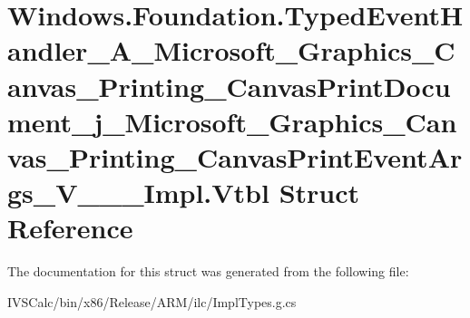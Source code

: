 \hypertarget{struct_windows_1_1_foundation_1_1_typed_event_handler___a___microsoft___graphics___canvas___prin5e98de4148f14711b8e776f3d80500e7}{}\section{Windows.\+Foundation.\+Typed\+Event\+Handler\+\_\+\+A\+\_\+\+Microsoft\+\_\+\+Graphics\+\_\+\+Canvas\+\_\+\+Printing\+\_\+\+Canvas\+Print\+Document\+\_\+j\+\_\+\+Microsoft\+\_\+\+Graphics\+\_\+\+Canvas\+\_\+\+Printing\+\_\+\+Canvas\+Print\+Event\+Args\+\_\+\+V\+\_\+\+\_\+\+\_\+\+Impl.\+Vtbl Struct Reference}
\label{struct_windows_1_1_foundation_1_1_typed_event_handler___a___microsoft___graphics___canvas___prin5e98de4148f14711b8e776f3d80500e7}


The documentation for this struct was generated from the following file\+:\begin{DoxyCompactItemize}
\item 
I\+V\+S\+Calc/bin/x86/\+Release/\+A\+R\+M/ilc/Impl\+Types.\+g.\+cs\end{DoxyCompactItemize}
